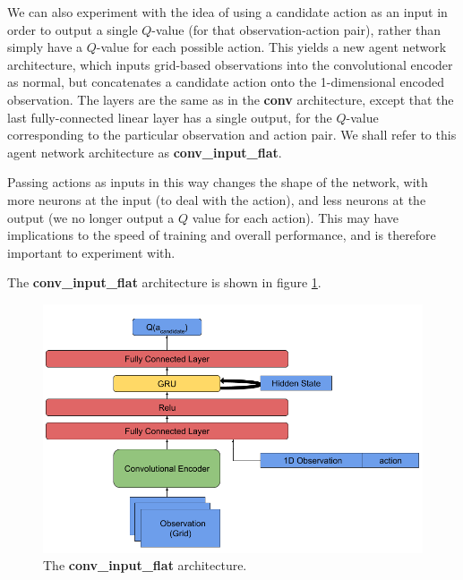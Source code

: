 We can also experiment with the idea of using a candidate action as an input in order to output a single $Q$-value (for that observation-action pair), rather than simply have a $Q$-value for each possible action. This yields a new agent network architecture, which inputs grid-based observations into the convolutional encoder as normal, but concatenates a candidate action onto the 1-dimensional encoded observation. The layers are the same as in the \textbf{conv} architecture, except that the last fully-connected linear layer has a single output, for the $Q$-value corresponding to the particular observation and action pair. We shall refer to this agent network architecture as \textbf{conv\_input\_flat}. 

Passing actions as inputs in this way changes the shape of the network, with more neurons at the input (to deal with the action), and less neurons at the output (we no longer output a $Q$ value for each action). This may have implications to the speed of training and overall performance, and is therefore important to experiment with. 

The \textbf{conv\_input\_flat} architecture is shown in figure \ref{fig:conv_input_flat_diagram}.

\begin{figure}
    \centering
    \includegraphics[scale=0.45]{images/agent_diagrams/rnn_mathias_agent_diagram.png}
    \caption{The \textbf{conv\_input\_flat} architecture.}
    \label{fig:conv_input_flat_diagram}
\end{figure}


